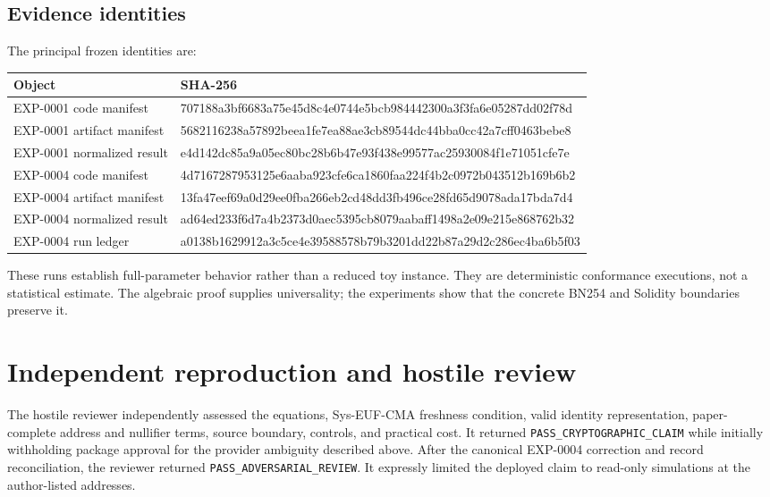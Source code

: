 \documentclass[10pt,a4paper]{article}
\begin{document}
\subsection{Evidence identities}

The principal frozen identities are:

\begin{center}
\begin{tabularx}{\textwidth}{@{}lX@{}}
\toprule
Object & SHA-256 \\
\midrule
EXP-0001 code manifest &
\ttfamily\small 707188a3bf6683a75e45d8c4e0744e5bcb984442300a3f3fa6e05287dd02f78d \\
EXP-0001 artifact manifest &
\ttfamily\small 5682116238a57892beea1fe7ea88ae3cb89544dc44bba0cc42a7cff0463bebe8 \\
EXP-0001 normalized result &
\ttfamily\small e4d142dc85a9a05ec80bc28b6b47e93f438e99577ac25930084f1e71051cfe7e \\
EXP-0004 code manifest &
\ttfamily\small 4d7167287953125e6aaba923cfe6ca1860faa224f4b2c0972b043512b169b6b2 \\
EXP-0004 artifact manifest &
\ttfamily\small 13fa47eef69a0d29ee0fba266eb2cd48dd3fb496ce28fd65d9078ada17bda7d4 \\
EXP-0004 normalized result &
\ttfamily\small ad64ed233f6d7a4b2373d0aec5395cb8079aabaff1498a2e09e215e868762b32 \\
EXP-0004 run ledger &
\ttfamily\small a0138b1629912a3c5ce4e39588578b79b3201dd22b87a29d2c286ec4ba6b5f03 \\
\bottomrule
\end{tabularx}
\end{center}

These runs establish full-parameter behavior rather than a reduced toy
instance. They are deterministic conformance executions, not a statistical
estimate. The algebraic proof supplies universality; the experiments show
that the concrete BN254 and Solidity boundaries preserve it.

\section{Independent reproduction and hostile review}

The hostile reviewer independently assessed the equations, Sys-EUF-CMA
freshness condition, valid identity representation, paper-complete address
and nullifier terms, source boundary, controls, and practical cost. It returned
\texttt{PASS\_CRYPTOGRAPHIC\_CLAIM} while initially withholding package
approval for the provider ambiguity described above. After the canonical
EXP-0004 correction and record reconciliation, the reviewer returned
\texttt{PASS\_ADVERSARIAL\_REVIEW}. It expressly limited the deployed claim to
read-only simulations at the author-listed addresses.
\end{document}
